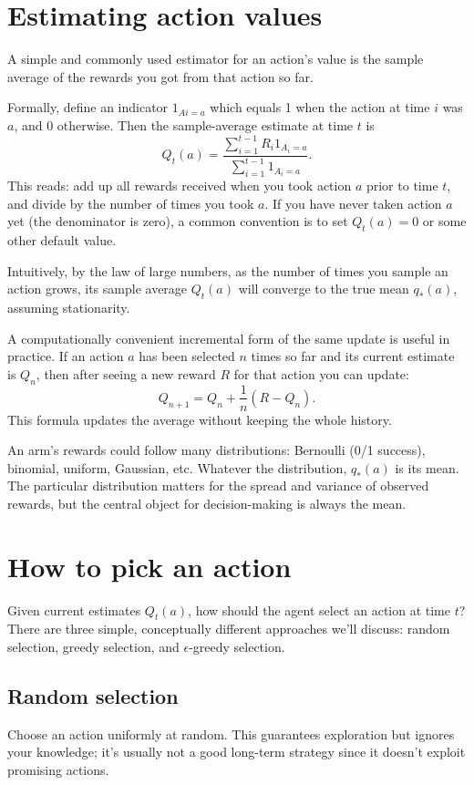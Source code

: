 \section{Estimating action values}
A simple and commonly used estimator for an action’s value is the sample average of the rewards you got from that action so far.

Formally, define an indicator $1_{{Ai=a}}$ which equals 1 when the action at time $i$ was $a$, and 0 otherwise. Then the sample-average estimate at time $t$ is
\begin{equation*}
    Q_t(a)=\frac{\sum_{i=1}^{t-1}R_i 1_{{A_i=a}}}{\sum_{i=1}^{t-1} 1_{{A_i=a}}}.
\end{equation*}
This reads: add up all rewards received when you took action $a$ prior to time $t$, and divide by the number of times you took $a$. If you have never taken action $a$ yet (the denominator is zero), a common convention is to set $Q_t(a)=0$ or some other default value.

Intuitively, by the law of large numbers, as the number of times you sample an action grows, its sample average $Q_t(a)$ will converge to the true mean $q_*(a)$, assuming stationarity.

A computationally convenient incremental form of the same update is useful in practice. If an action $a$ has been selected $n$ times so far and its current estimate is $Q_n$, then after seeing a new reward $R$ for that action you can update:
\begin{equation*}
    Q_{n+1}=Q_n+\frac{1}{n}(R-Q_n).    
\end{equation*}
This formula updates the average without keeping the whole history.

An arm’s rewards could follow many distributions: Bernoulli (0/1 success), binomial, uniform, Gaussian, etc. Whatever the distribution, 
$q_*(a)$ is its mean. The particular distribution matters for the spread and variance of observed rewards, but the central object for decision-making is always the mean.

\section{How to pick an action}
Given current estimates $Q_t(a)$, how should the agent select an action at time $t$? There are three simple, conceptually different approaches we’ll discuss: random selection, greedy selection, and $\epsilon$-greedy selection.

\subsection{Random selection}
Choose an action uniformly at random. This guarantees exploration but ignores your knowledge; it’s usually not a good long-term strategy since it doesn’t exploit promising actions.

